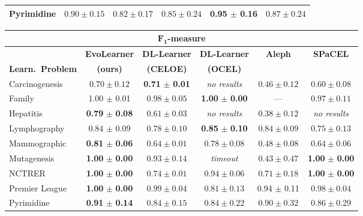 \begin{table}[tbp]
\begin{tabular}{@{}lccccc@{}}
    Pyrimidine & $0.90 \pm 0.15$ & $0.82 \pm 0.17$ & $0.85 \pm 0.24$ & \textbf{0.95} $\boldsymbol{\pm} $ \textbf{0.16} & $0.87 \pm 0.24$ \\
    \bottomrule
  \end{tabular}
%
  \setlength{\tabcolsep}{1.6pt}
  \begin{tabular}{@{}lccccc@{}}
    \toprule
    \multicolumn{6}{c}{\textbf{$\boldsymbol{F_1}$-measure}}\\
    \midrule
     & \textbf{EvoLearner} & \textbf{DL-Learner} & \textbf{DL-Learner} & \textbf{Aleph} & \textbf{SPaCEL} \\
    \textbf{Learn.~Problem} & \textbf{(ours)} & \textbf{(CELOE)} & \textbf{(OCEL)} &  & \\
    \midrule
    Carcinogenesis &  $0.70 \pm 0.12$ &  \textbf{0.71} $\boldsymbol{\pm}$ \textbf{0.01} & \textit{no results} & $0.46 \pm 0.12$ & $0.60 \pm 0.08$  \\
    Family & 1.00 $\pm$ 0.01  &  $0.98 \pm 0.05$ & \textbf{1.00} $\boldsymbol{\pm}$ \textbf{0.00} & --- & $0.97 \pm 0.11$ \\
    Hepatitis & \textbf{0.79} $\boldsymbol{\pm}$ \textbf{0.08} & $0.61 \pm 0.03$ & \textit{no results} & $0.38 \pm 0.12$ & \textit{no results}  \\
    Lymphography & 0.84 $\pm$ 0.09 &  $0.78 \pm 0.10$ & \textbf{0.85} $\boldsymbol{\pm}$ \textbf{0.10}  & $0.84 \pm 0.09$ & $0.75 \pm 0.13$  \\
    Mammographic & \textbf{0.81} $\boldsymbol{\pm}$ \textbf{0.06}&  $0.64 \pm 0.01$ & $0.78 \pm 0.08$ & $0.48 \pm 0.08$ & $0.64 \pm 0.06$ \\
    Mutagenesis & \textbf{1.00} $\boldsymbol{\pm} $ \textbf{0.00} &  $0.93 \pm 0.14$ & \textit{timeout} & $0.43 \pm 0.47$ & \textbf{1.00} $\boldsymbol{\pm} $ \textbf{0.00} \\
    NCTRER & \textbf{1.00} $\boldsymbol{\pm}$ \textbf{0.00}&  $0.74 \pm 0.01$ & $0.94 \pm 0.06$ & $0.71 \pm 0.18$ & \textbf{1.00} $\boldsymbol{\pm}$ \textbf{0.00} \\
    Premier League & \textbf{1.00} $\boldsymbol{\pm}$ \textbf{0.00} & $0.99 \pm 0.04$ & $0.81 \pm 0.13$ & 0.94 $\pm $ 0.11 & $0.98 \pm 0.04$ \\
    Pyrimidine & \textbf{0.91} $\boldsymbol{\pm} $ \textbf{0.14}  &  $0.84 \pm 0.15$ & $0.84 \pm 0.22$ & $0.90 \pm 0.32$  & $0.86 \pm 0.29$  \\
    \bottomrule
  \end{tabular}
%
  \setlength{\tabcolsep}{4.5pt}
  \begin{tabular}{@{}lcccc@{}}

\end{tabular}
\end{table}
